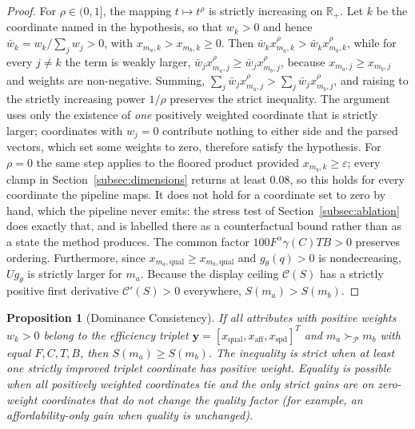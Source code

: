 \documentclass[pdflatex,sn-mathphys-num]{sn-jnl}
\theoremstyle{thmstyleone}
\newtheorem{proposition}{Proposition}
\theoremstyle{thmstylethree}
\begin{document}
\begin{proof}
For $\rho \in (0, 1]$, the mapping $t \mapsto t^\rho$ is strictly increasing on $\mathbb{R}_+$. Let $k$ be the coordinate named in the hypothesis, so that $w_k > 0$ and hence $\bar{w}_k = w_k / \sum_j w_j > 0$, with $x_{m_a, k} > x_{m_b, k} \ge 0$. Then $\bar{w}_k x_{m_a, k}^\rho > \bar{w}_k x_{m_b, k}^\rho$, while for every $j \ne k$ the term is weakly larger, $\bar{w}_j x_{m_a, j}^\rho \ge \bar{w}_j x_{m_b, j}^\rho$, because $x_{m_a, j} \ge x_{m_b, j}$ and weights are non-negative. Summing, $\sum_j \bar{w}_j x_{m_a, j}^\rho > \sum_j \bar{w}_j x_{m_b, j}^\rho$, and raising to the strictly increasing power $1/\rho$ preserves the strict inequality. The argument uses only the existence of \emph{one} positively weighted coordinate that is strictly larger; coordinates with $w_j = 0$ contribute nothing to either side and the parsed vectors, which set some weights to zero, therefore satisfy the hypothesis. For $\rho = 0$ the same step applies to the floored product provided $x_{m_b, k} \ge \varepsilon$; every clamp in Section~\ref{subsec:dimensions} returns at least $0.08$, so this holds for every coordinate the pipeline maps. It does not hold for a coordinate set to zero by hand, which the pipeline never emits: the stress test of Section~\ref{subsec:ablation} does exactly that, and is labelled there as a counterfactual bound rather than as a state the method produces. The common factor $100 F^\alpha \gamma(C) T B > 0$ preserves ordering. Furthermore, since $x_{m_a, \text{qual}} \ge x_{m_b, \text{qual}}$ and $g_\theta(q) > 0$ is nondecreasing, $U g_\theta$ is strictly larger for $m_a$. Because the display ceiling $\mathcal{C}(S)$ has a strictly positive first derivative $\mathcal{C}'(S) > 0$ everywhere, $S(m_a) > S(m_b)$.
\end{proof}

\begin{proposition}[Dominance Consistency]\label{prop:dominance}
If all attributes with positive weights $w_k > 0$ belong to the efficiency triplet $\mathbf{y} = [x_{\text{qual}}, x_{\text{aff}}, x_{\text{spd}}]^T$ and $m_a \succ_{\mathcal{P}} m_b$ with equal $F, C, T, B$, then $S(m_a) \ge S(m_b)$. The inequality is strict when at least one strictly improved triplet coordinate has positive weight. Equality is possible when all positively weighted coordinates tie and the only strict gains are on zero-weight coordinates that do not change the quality factor (for example, an affordability-only gain when quality is unchanged).
\end{proposition}
\end{document}
